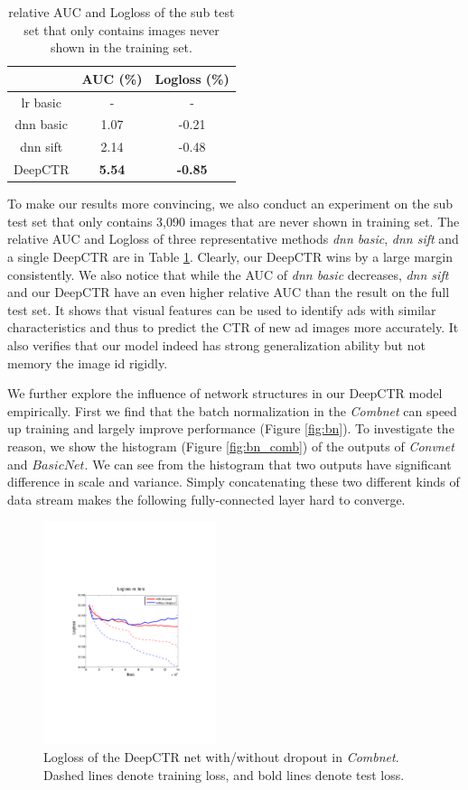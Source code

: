 \documentclass{sig-alternate}
\begin{document}
\begin{table}
	\centering
	\caption{relative AUC and Logloss of the sub test set that only contains images never shown in the training set.}
	\label{table:subset}
	\begin{tabular}{|c|c|c|} \hline
		 & AUC (\%) & Logloss (\%)\\ \hline
		lr basic & - & - \\ \hline
		dnn basic & 1.07 & -0.21 \\ \hline
		dnn sift & 2.14 & -0.48  \\ \hline
		DeepCTR & \textbf{5.54} & \textbf{-0.85} \\ \hline
	\end{tabular}
\end{table}
To make our results more convincing, we also conduct an experiment on the sub test set that only contains 3,090 images that are never shown in training set. The relative AUC and Logloss of three representative methods \emph{dnn basic}, \emph{dnn sift} and a single DeepCTR are in Table \ref{table:subset}. Clearly, our DeepCTR wins by a large margin consistently. We also notice that while the AUC of \emph{dnn basic} decreases, \emph{dnn sift} and our DeepCTR have an even higher relative AUC than the result on the full test set. It shows that visual features can be used to identify ads with similar characteristics and thus to predict the CTR of new ad images more accurately.   It also verifies that our model indeed has strong generalization ability but not  memory the image id rigidly.   

We further  explore the influence of network structures in our DeepCTR model empirically. First we find that the batch normalization in the \emph{Combnet} can speed up training and largely improve performance (Figure \ref{fig:bn}). To investigate the reason, we show the histogram (Figure \ref{fig:bn_comb}) of the outputs of \emph{Convnet} and $BasicNet$. We can see from the histogram  that two outputs have significant difference in scale and variance. Simply concatenating  these two different kinds of data stream  makes the following fully-connected layer hard to converge. 
\begin{figure}
	\centering
	\includegraphics[width=0.45\textwidth]{dropout_test_train}
	\caption{Logloss of the DeepCTR net with/without dropout in \emph{Combnet}. Dashed lines denote training loss, and bold lines denote test loss.}
	\label{fig:dropout}
\end{figure}
\end{document}
